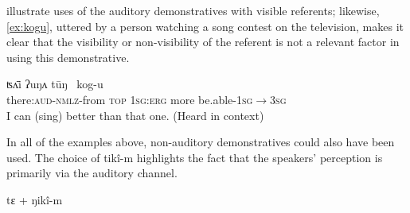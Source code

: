 \documentclass[oneside,a4paper,11pt]{article}
\newcommand{\ipa}[1]{{\phon \mbox{#1}}} %
\begin{document}
 
  illustrate uses of the auditory demonstratives with visible referents; likewise,   \ref{ex:kogu}, uttered by a person watching a song contest on the television, makes it clear that the visibility or non-visibility of the referent is not a relevant factor in using this demonstrative.

\begin{exe}
\ex \label{ex:kogu}
\gll  	\ipa{tikî-m-kʌ}   	\ipa{ʦʌ̄i} \ipa{ʔuŋʌ} \ipa{tūŋ }   	\ipa{kog-u}   \\
there:\textsc{aud}-\textsc{nmlz}-from \textsc{top} \textsc{1sg:erg} more be.able-\textsc{1sg$\rightarrow$3sg}	  \\
\glt I can (sing) better than that one. (Heard in context)
\end{exe}

 

In all of the examples above, non-auditory demonstratives could also have been used. The choice of \ipa{tikî-m}  highlights the  fact that the  speakers' perception is primarily via the auditory channel.
 
 \ipa{tɛ} + \ipa{ŋikî-m}

 

\begin{table}
\caption{Systems     including auditory demonstratives } \label{tab:attested}
\end{table}	


\citet{aikhenvald14knowledge}
\citet{dixon14nonvisible}
\citet{storch14maaka}
\citet{gutierrez11evidentiality}
\citet{yang00hearsay}
\citet{yang00tsou.case}
\citet{matthewson07epistemic}
\citet{gutierrez12determiners}
 
\end{document}
